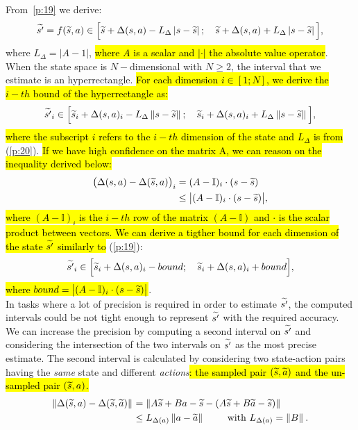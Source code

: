 From~\eqref{p:19} we derive:
\begin{align}
	\widetilde{s'}=f(\widetilde{s}, a) \in \Big[\widetilde{s} + \Delta(s,a) - L_{\Delta} \left|s - \widetilde{s}\right|; \quad \widetilde{s} + \Delta(s,a) + L_{\Delta} \left|s - \widetilde{s}\right|\Big],
\end{align}
where $L_{\Delta} = |A - 1|$, \hl{where $A$ is a scalar and $|\cdot|$ the absolute value operator}.
When the state space is $N-$dimensional with $N\geq 2$, the interval that we estimate is an hyperrectangle. \hl{For each dimension $i \in [1;N]$, we derive the $i-th$ bound of the hyperrectangle as:}
\begin{align}
	\widetilde{s'}_{i} \in \Big[\widetilde{s}_{i} + \Delta(s,a)_{i} - L_{\Delta} \left\|s - \widetilde{s}\right\|_{}; \quad \widetilde{s}_{i} + \Delta(s,a)_{i} + L_{\Delta} \left\|s - \widetilde{s}\right\|_{}\Big],
\end{align}
\hl{where the subscript $i$ refers to the $i-th$ dimension of the state and $L_{\Delta}$ is from} (\ref{p:20}). \hl{If we have high confidence on the matrix A, we can reason on the inequality derived below:}
\begin{align}
	\big(\Delta(s,a)-\Delta(\widetilde{s},a)\big)_{i} &= (A-\mathbb{I})_{i} \cdot (s-\widetilde{s}) \nonumber\\
	&\leq \big| (A-\mathbb{I})_{i} \cdot (s - \widetilde{s})\big|,
\end{align}
\hl{where $(A-\mathbb{I})_{i}$ is the $i-th$ row of the matrix $(A-\mathbb{I})$ and $\cdot$ is the scalar product between vectors. We can derive a tigther bound for each dimension of the state $\widetilde{s'}$ similarly to} (\ref{p:19}):
\begin{align}
	\widetilde{s'}_{i} \in \Big[\widetilde{s}_{i} + \Delta(s,a)_{i} - bound; \quad \widetilde{s}_{i} + \Delta(s,a)_{i} + bound \Big],
\end{align}
\hl{where $bound = \big| (A-\mathbb{I})_{i} \cdot (s - \widetilde{s})\big|$}.\\
\newline
In tasks where a lot of precision is required in order to estimate $\widetilde{s'}$, the computed intervals could be not tight enough to represent $\widetilde{s'}$ with the required accuracy. We can increase the precision by computing a second interval on $\widetilde{s'}$ and considering the intersection of the two intervals on $\widetilde{s'}$ as the most precise estimate. The second interval is calculated by considering two state-action pairs having the \emph{same} state and different \emph{actions}\hl{: the sampled pair $(\widetilde{s},\widetilde{a})$ and the un-sampled pair $(\widetilde{s},a)$.}
\begin{align}
\left\|\Delta(\widetilde{s},a) - \Delta(\widetilde{s}, \widetilde{a})\right\|_{} &= \left\|A\widetilde{s}+Ba-\widetilde{s} - \left(A\widetilde{s}+B\widetilde{a}-\widetilde{s}\right)\right\|_{} \nonumber \\
&\leq L_{\Delta(a)} \left\|a-\widetilde{a}\right\|_{} \qquad \text{ with } L_{\Delta(a)}=\left\|B\right\|_{}. \label{p:21}
\end{align}
